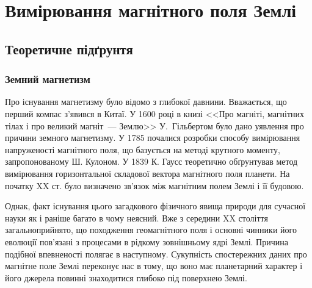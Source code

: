 
%
\expandafter\graphicspath\expandafter{\expandafter{\currfilebase/pic}}
\usetikzlibrary{arrows.meta}




\chapter{Вимірювання магнітного поля Землі}
\makeworktitle


\section{Теоретичне підґрунтя}

\subsection{Земний магнетизм}

Про існування магнетизму було відомо з глибокої давнини. Вважається, що перший компас з'явився в Китаї. У 1600 році в книзі  <<Про магніті, магнітних тілах і про великий магніт~--- Землю>> У.~Гільбертом  було дано уявлення про причини земного магнетизму. У 1785 почалися розробки способу вимірювання напруженості магнітного поля, що базується на методі крутного моменту, запропонованому Ш. Кулоном. У 1839 К. Гаусс теоретично обґрунтував метод вимірювання горизонтальної складової вектора магнітного поля планети. На початку XX ст. було визначено зв'язок між магнітним полем Землі і її будовою.

Однак, факт існування цього загадкового фізичного явища природи для сучасної науки як і раніше багато в чому неясний. Вже з середини XX століття загальноприйнято, що походження геомагнітного поля і основні чинники його еволюції пов'язані з процесами в рідкому зовнішньому ядрі Землі. Причина подібної впевненості полягає в наступному. Сукупність спостережних даних про магнітне поле Землі переконує нас в тому, що воно має планетарний характер і його джерела повинні знаходитися глибоко під поверхнею Землі.

